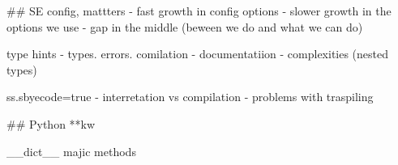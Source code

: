 ## SE
config, mattters
- fast growth in config options
- slower growth in the options we use
- gap in the middle (beween we do and what we can do)

type hints
- types. errors. comilation
- documentatiion
- complexities (nested types)

ss.sbyecode=true
- interretation vs compilation
- problems with traspiling

## Python
**kw

__dict__
majic methods

